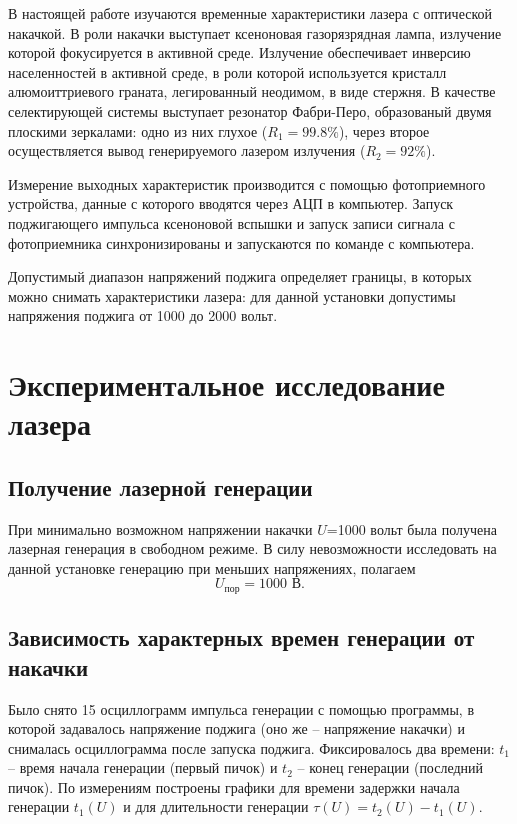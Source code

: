 \documentclass[a4paper,14pt]{extarticle}
\begin{document}
В настоящей работе изучаются временные характеристики лазера с оптической накачкой. В роли накачки выступает ксеноновая газорязрядная лампа, излучение которой фокусируется в активной среде. Излучение обеспечивает инверсию населенностей в активной среде, в роли которой используется кристалл алюмоиттриевого граната, легированный неодимом, в виде стержня. В качестве селектирующей системы выступает резонатор Фабри-Перо, образованый двумя плоскими зеркалами: одно из них глухое ($R_1=99.8\%$), через второе осуществляется вывод генерируемого лазером излучения ($R_2=92\%$).

Измерение выходных характеристик производится с помощью фотоприемного устройства, данные с которого вводятся через АЦП в компьютер. Запуск поджигающего импульса ксеноновой вспышки и запуск записи сигнала с фотоприемника синхронизированы и запускаются по команде с компьютера.

Допустимый диапазон напряжений поджига определяет границы, в которых можно снимать характеристики лазера: для данной установки допустимы напряжения поджига от 1000 до 2000 вольт.


\newpage

\section{Экспериментальное исследование лазера}
\subsection{Получение лазерной генерации}

При минимально возможном напряжении накачки $U$=1000 вольт была получена лазерная генерация в свободном режиме. В силу невозможности исследовать на данной установке генерацию при меньших напряжениях, полагаем
\begin{equation}
  U_\text{пор}=1000\text{ В}.
\end{equation}


\subsection{Зависимость характерных времен генерации от накачки}
Было снято 15 осциллограмм импульса генерации с помощью программы, в которой задавалось напряжение поджига (оно же -- напряжение накачки) и снималась осциллограмма после запуска поджига. Фиксировалось два времени: $t_1$ -- время начала генерации (первый пичок) и $t_2$ -- конец генерации (последний пичок). По измерениям построены графики для времени задержки начала генерации $t_1(U)$ и для длительности генерации $\tau(U)=t_2(U)-t_1(U)$.
\end{document}
